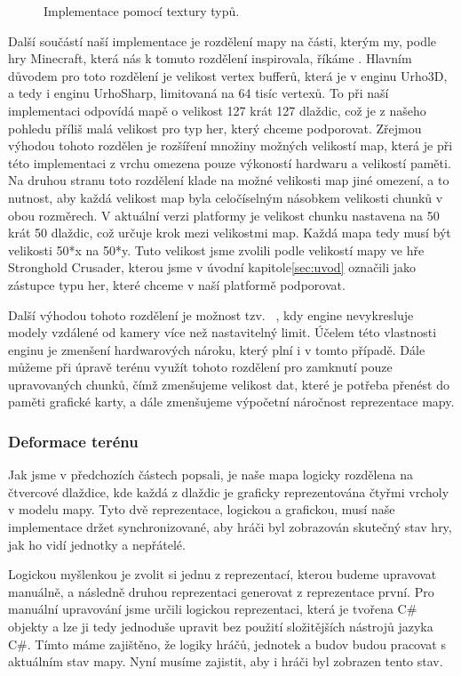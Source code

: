 \begin{figure}[h]
	\centering
	
	\caption{Implementace pomocí textury typů.}
	\label{fig:mapsmalltexture}
\end{figure}


Další součástí naší implementace je rozdělení mapy na části, kterým my, podle hry Minecraft, která nás k tomuto rozdělení inspirovala, říkáme  . Hlavním důvodem pro toto rozdělení je velikost vertex bufferů, která je v enginu Urho3D, a tedy i enginu UrhoSharp, limitovaná na 64 tisíc vertexů. To při naší implementaci odpovídá mapě o velikost 127 krát 127 dlaždic, což je z našeho pohledu příliš malá velikost pro typ her, který chceme podporovat. Zřejmou výhodou tohoto rozdělen je rozšíření množiny možných velikostí map, která je při této implementaci z vrchu omezena pouze výkoností hardwaru a velikostí paměti. Na druhou stranu toto rozdělení klade na možné velikosti map jiné omezení, a to nutnost, aby každá velikost map byla celočíselným násobkem velikosti chunků v obou rozměrech. V aktuální verzi platformy je velikost chunku nastavena na 50 krát 50 dlaždic, což určuje krok mezi velikostmi map. Každá mapa tedy musí být velikosti 50*x na 50*y. Tuto velikost jsme zvolili podle velikostí mapy ve hře Stronghold Crusader, kterou jsme v úvodní kapitole\ref{sec:uvod} označili jako zástupce typu her, které chceme v naší platformě podporovat.

Další výhodou tohoto rozdělení je možnost tzv.~ , kdy engine nevykresluje modely vzdálené od kamery více než nastavitelný limit. Účelem této vlastnosti enginu je zmenšení hardwarových nároku, který plní i v tomto případě. Dále můžeme při úpravě terénu využít tohoto rozdělení pro zamknutí pouze upravovaných chunků, čímž zmenšujeme velikost dat, které je potřeba přenést do paměti grafické karty, a dále zmenšujeme výpočetní náročnost reprezentace mapy.

\subsubsection{Deformace terénu}
Jak jsme v předchozích částech popsali, je naše mapa logicky rozdělena na čtvercové dlaždice, kde každá z dlaždic je graficky reprezentována čtyřmi vrcholy v modelu mapy. Tyto dvě reprezentace, logickou a grafickou, musí naše implementace držet synchronizované, aby hráči byl zobrazován skutečný stav hry, jak ho vidí jednotky a nepřátelé. 

Logickou myšlenkou je zvolit si jednu z reprezentací, kterou budeme upravovat manuálně, a následně druhou reprezentaci generovat z reprezentace první. Pro manuální upravování jsme určili logickou reprezentaci, která je tvořena C\# objekty a lze ji tedy jednoduše upravit bez použití složitějších nástrojů jazyka C\#. Tímto máme zajištěno, že logiky hráčů, jednotek a budov budou pracovat s aktuálním stav mapy. Nyní musíme zajistit, aby i hráči byl zobrazen tento stav.

